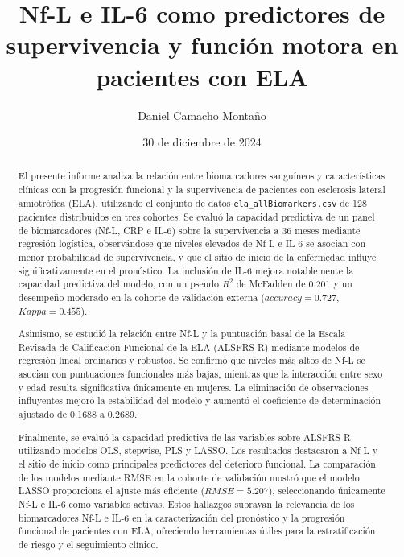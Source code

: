 \documentclass[12pt]{article} %
\title{Nf-L e IL-6 como predictores de supervivencia y función motora en pacientes con ELA}
\author{Daniel Camacho Montaño}
\date{30 de diciembre de 2024}
\begin{document}
\maketitle 
\newpage
\begin{abstract}
El presente informe analiza la relación entre biomarcadores sanguíneos y características clínicas con la progresión funcional y la supervivencia de pacientes con esclerosis lateral amiotrófica (ELA), utilizando el conjunto de datos \texttt{ela\_allBiomarkers.csv} de 128 pacientes distribuidos en tres cohortes. Se evaluó la capacidad predictiva de un panel de biomarcadores (Nf-L, CRP e IL-6) sobre la supervivencia a 36 meses mediante regresión logística, observándose que niveles elevados de Nf-L e IL-6 se asocian con menor probabilidad de supervivencia, y que el sitio de inicio de la enfermedad influye significativamente en el pronóstico. La inclusión de IL-6 mejora notablemente la capacidad predictiva del modelo, con un pseudo $R^2$ de McFadden de 0.201 y un desempeño moderado en la cohorte de validación externa ($accuracy = 0.727$, $Kappa = 0.455$). 

Asimismo, se estudió la relación entre Nf-L y la puntuación basal de la Escala Revisada de Calificación Funcional de la ELA (ALSFRS-R) mediante modelos de regresión lineal ordinarios y robustos. Se confirmó que niveles más altos de Nf-L se asocian con puntuaciones funcionales más bajas, mientras que la interacción entre sexo y edad resulta significativa únicamente en mujeres. La eliminación de observaciones influyentes mejoró la estabilidad del modelo y aumentó el coeficiente de determinación ajustado de 0.1688 a 0.2689. 

Finalmente, se evaluó la capacidad predictiva de las variables sobre ALSFRS-R utilizando modelos OLS, stepwise, PLS y LASSO. Los resultados destacaron a Nf-L y el sitio de inicio como principales predictores del deterioro funcional. La comparación de los modelos mediante RMSE en la cohorte de validación mostró que el modelo LASSO proporciona el ajuste más eficiente ($RMSE = 5.207$), seleccionando únicamente Nf-L e IL-6 como variables activas. Estos hallazgos subrayan la relevancia de los biomarcadores Nf-L e IL-6 en la caracterización del pronóstico y la progresión funcional de pacientes con ELA, ofreciendo herramientas útiles para la estratificación de riesgo y el seguimiento clínico.
\end{abstract}
\newpage
\end{document}
